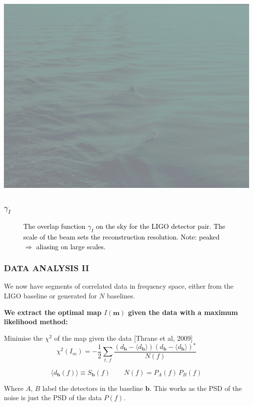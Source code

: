 \documentclass[handout]{beamer}
\begin{document}
{\usebackgroundtemplate%
{%
    \includegraphics[width=\paperwidth,height=\paperheight]{bklight.jpg}%
}
\begin{frame}[plain]

	\frametitle{\textcolor{black}{$\gamma_I$}}
    
	\begin{figure}
	\caption*{\centering \small \textcolor{black}{The overlap function $\gamma_I$ on the sky for the LIGO detector pair. The scale of the beam sets the reconstruction resolution. Note: peaked $\Rightarrow$ aliasing on large scales.}}
	\end{figure}
    \smallskip

\end{frame}
}
\begin{frame}
	\frametitle{DATA ANALYSIS II}
    We now have segments of correlated data in frequency space, either from the LIGO baseline or generated for $N$ baselines.\\
    
    \begin{block}{}
    \centering
    \textcolor{textcol}{ \bf We extract the \textbf{optimal map} $I(\bm m)$ given the data with a \textbf{maximum likelihood method}: }
    \end{block}
    Minimise the $\chi^2$ of the map given the data [Thrane et al, 2009]
            \begin{equation}
		\chi^2(I_{m}) = -\frac{1}{2} \sum_{t,\,f}\frac{(d_{\bm b}-\langle d_{\bm b}\rangle)(d_{\bm b}-			\langle d_{\bm b}\rangle)^\star}{N(f)}
		\label{chisqu}
		\end{equation}

$$ \langle d_{\bm b}(f)\rangle\equiv S_{\bm b} (f) \qquad N(f) = P_A(f)\,P_B(f)$$

Where $A$, $B$ label the detectors in the baseline $\bm b$. This works as the PSD of the noise is just the PSD of the data $P(f)$.

\end{frame}
\end{document}
